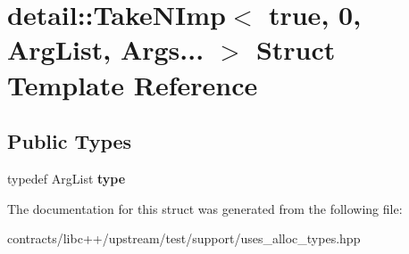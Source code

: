 \hypertarget{structdetail_1_1_take_n_imp_3_01true_00_010_00_01_arg_list_00_01_args_8_8_8_01_4}{}\section{detail\+:\+:Take\+N\+Imp$<$ true, 0, Arg\+List, Args... $>$ Struct Template Reference}
\label{structdetail_1_1_take_n_imp_3_01true_00_010_00_01_arg_list_00_01_args_8_8_8_01_4}
\subsection*{Public Types}
\begin{DoxyCompactItemize}
\item 
\mbox{\label{structdetail_1_1_take_n_imp_3_01true_00_010_00_01_arg_list_00_01_args_8_8_8_01_4_a419a6a579be7b45a10b89a528f34e1b7}} 
typedef Arg\+List {\bfseries type}
\end{DoxyCompactItemize}


The documentation for this struct was generated from the following file\+:\begin{DoxyCompactItemize}
\item 
contracts/libc++/upstream/test/support/uses\+\_\+alloc\+\_\+types.\+hpp\end{DoxyCompactItemize}
